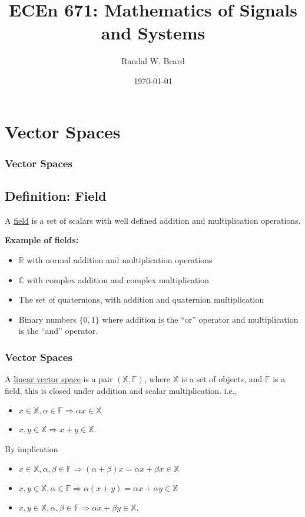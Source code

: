 \documentclass{beamer}
\title{ECEn 671: Mathematics of Signals and Systems}
\author{Randal W. Beard}
\institute{Brigham Young University}
\date{\today}
\begin{document}
\begin{frame}
	\titlepage
\end{frame}



\section{Vector Spaces}
\frame{\sectionpage}

\begin{frame}\frametitle{Vector Spaces}


\subsection*{Definition: Field} A \underline{field} is a set of scalars with well defined addition and multiplication operations.

{\bf Example of fields:}  
\begin{itemize}
\item $\mathbb{R}$ with normal addition and multiplication operations
\item $\mathbb{C}$ with complex addition and complex multiplication
\item The set of quaternions, with addition and quaternion multiplication
\item Binary numbers $\{0, 1\}$ where addition is the ``or'' operator and multiplication is the ``and'' operator.
\end{itemize}
\end{frame}

\begin{frame}\frametitle{Vector Spaces}

\begin{definition} A \underline{linear vector space} is a pair $(\mathbb{X},\mathbb{F})$, where  $\mathbb{X}$ is a set of objects, and $\mathbb{F}$ is a field, this is closed under addition and scalar multiplication. i.e., \\
\begin{itemize}
\item $x\in\mathbb{X}, \alpha \in \mathbb{F} \Rightarrow \alpha x \in \mathbb{X}$
\item $x,y \in \mathbb{X} \Rightarrow x+y\in\mathbb{X}$.
\end{itemize}
\end{definition}
By implication
\begin{itemize}
\item $x\in\mathbb{X}, \alpha,\beta\in\mathbb{F} \Rightarrow (\alpha + \beta)x = \alpha x + \beta x \in \mathbb{X}$
\item $x,y\in\mathbb{X}, \alpha\in\mathbb{F} \Rightarrow \alpha(x + y) = \alpha x + \alpha y \in\mathbb{X}$
\item $x,y\in\mathbb{X}, \alpha,\beta\in\mathbb{F} \Rightarrow \alpha x + \beta y \in \mathbb{X}$.
\end{itemize}
\end{frame}
\end{document}
